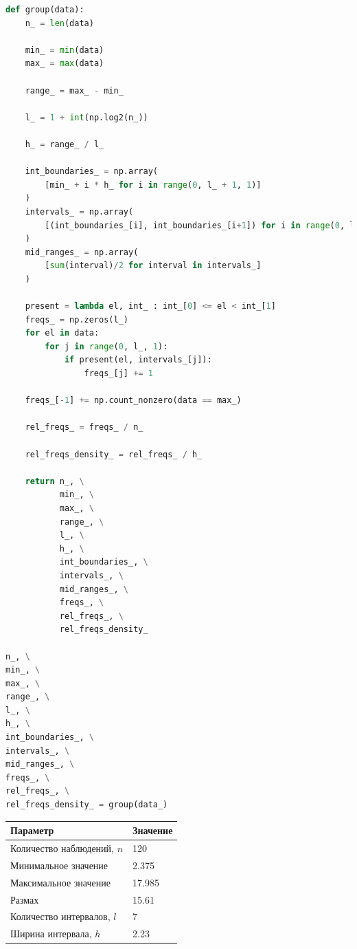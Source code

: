 \documentclass[a4paper, 14pt]{extarticle}
\begin{document}
\begin{center}
  \begin{lstlisting}[language=Python]
def group(data):
    n_ = len(data)

    min_ = min(data)
    max_ = max(data)

    range_ = max_ - min_

    l_ = 1 + int(np.log2(n_))

    h_ = range_ / l_

    int_boundaries_ = np.array(
        [min_ + i * h_ for i in range(0, l_ + 1, 1)]
    )
    intervals_ = np.array(
        [(int_boundaries_[i], int_boundaries_[i+1]) for i in range(0, l_, 1)]
    )
    mid_ranges_ = np.array(
        [sum(interval)/2 for interval in intervals_]
    )

    present = lambda el, int_ : int_[0] <= el < int_[1]
    freqs_ = np.zeros(l_)
    for el in data:
        for j in range(0, l_, 1):
            if present(el, intervals_[j]):
                freqs_[j] += 1 

    freqs_[-1] += np.count_nonzero(data == max_)

    rel_freqs_ = freqs_ / n_

    rel_freqs_density_ = rel_freqs_ / h_

    return n_, \
           min_, \
           max_, \
           range_, \
           l_, \
           h_, \
           int_boundaries_, \
           intervals_, \
           mid_ranges_, \
           freqs_, \
           rel_freqs_, \
           rel_freqs_density_

n_, \
min_, \
max_, \
range_, \
l_, \
h_, \
int_boundaries_, \
intervals_, \
mid_ranges_, \
freqs_, \
rel_freqs_, \
rel_freqs_density_ = group(data_)
  \end{lstlisting}
\end{center}

\begin{center}
    \renewcommand{\arraystretch}{1.5}
    \begin{tabular}{ll}
        \toprule
        \textbf{Параметр} & \textbf{Значение} \\
        \midrule
        Количество наблюдений, \( n \) & 120 \\
        Минимальное значение & 2.375 \\
        Максимальное значение & 17.985 \\
        Размах & 15.61 \\
        Количество интервалов, \( l \) & 7 \\
        Ширина интервала, \( h \) & 2.23 \\
        \bottomrule
    \end{tabular}
\end{center}
\end{document}
